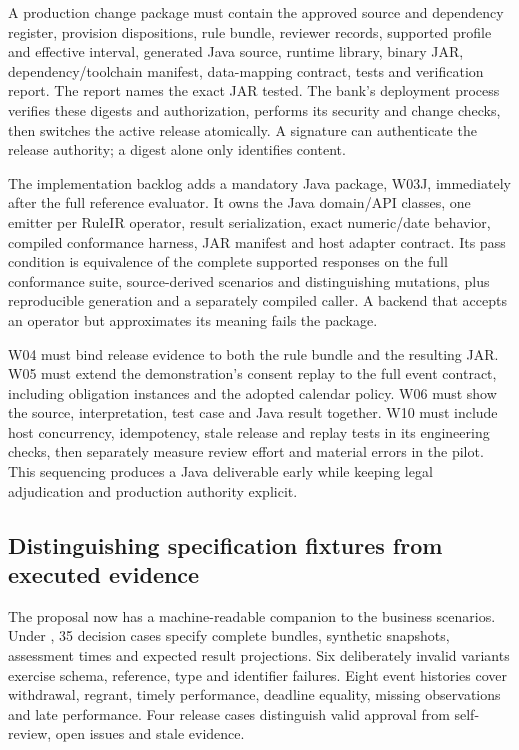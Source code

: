 A production change package must contain the approved source and dependency
register, provision dispositions, rule bundle, reviewer records, supported
profile and effective interval, generated Java source, runtime library, binary
JAR, dependency/toolchain manifest, data-mapping contract, tests and verification
report. The report names the exact JAR tested. The bank's deployment process
verifies these digests and authorization, performs its security and change checks,
then switches the active release atomically. A signature can authenticate the
release authority; a digest alone only identifies content.

The implementation backlog adds a mandatory Java package, W03J, immediately
after the full reference evaluator. It owns the Java domain/API classes, one
emitter per RuleIR operator, result serialization, exact numeric/date behavior,
compiled conformance harness, JAR manifest and host adapter contract. Its pass
condition is equivalence of the complete supported responses on the full
conformance suite, source-derived scenarios and distinguishing mutations,
plus reproducible generation and a separately compiled caller. A backend that
accepts an operator but approximates its meaning fails the package.

W04 must bind release evidence to both the rule bundle and the resulting JAR.
W05 must extend the demonstration's consent replay to the full event contract,
including obligation instances and the adopted calendar policy. W06 must show
the source, interpretation, test case and Java result together. W10 must include
host concurrency, idempotency, stale release and replay tests in its engineering
checks, then separately measure review effort and material errors in the pilot.
This sequencing produces a Java deliverable early while keeping legal
adjudication and production authority explicit.

\subsection{Distinguishing specification fixtures from executed evidence}
\label{merge:P-05-evidence:01}


The proposal now has a machine-readable companion to the business scenarios.
Under , 35 decision cases specify complete bundles,
synthetic snapshots, assessment times and expected result projections. Six
deliberately invalid variants exercise schema, reference, type and identifier
failures. Eight event histories cover withdrawal, regrant, timely performance,
deadline equality, missing observations and late performance. Four release cases
distinguish valid approval from self-review, open issues and stale evidence.

